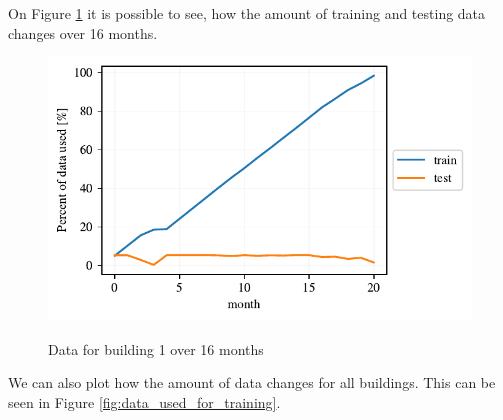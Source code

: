 On Figure \ref{fig:dyn_data_1} it is possible to see,
how the amount of training and testing data changes over 16 months.

\begin{figure}[H]
	\centering
	\caption{Data for building 1 over 16 months}
	\includegraphics[]{Figures/EC/DYN/tst_tr_b1.pdf}
	\label{fig:dyn_data_1}
\end{figure}

We can also plot how the amount of data changes for all buildings.
This can be seen in Figure \ref{fig:data_used_for_training}.

